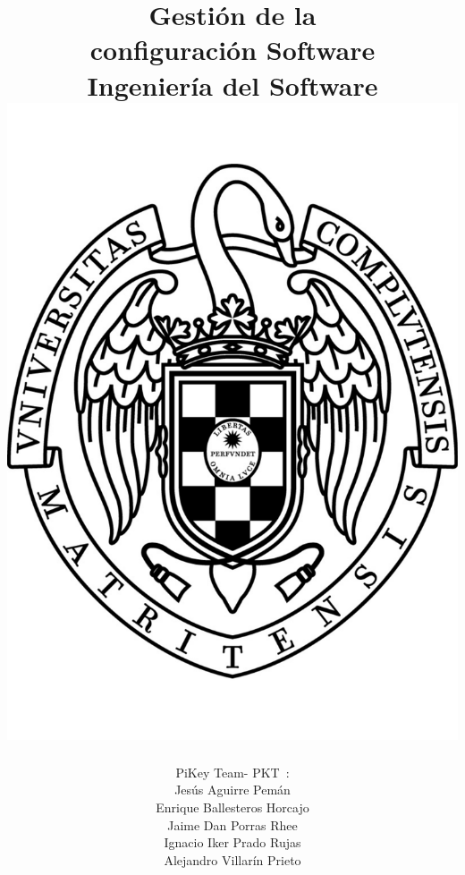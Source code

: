 \documentclass[spanish,a4paper,11pt, twoside]{report}	%
\newcommand*{\PKT}{\hbox{P}\kern-2.5pt\lower3.5pt\hbox{\small{K}}\kern-2.8pt\hbox{T}\kern-2pt}	%
\begin{document}
\title{\textbf{\huge{Gestión de la \\ 
	configuración Software}} \\ \vspace{0.3cm}
	\Large{Ingeniería del Software} \\
	\includegraphics[scale=0.3]{ucm.pdf}}
\author{{\Large{PiKey Team-}} \PKT \ : \vspace{0.2cm} \\
	Jesús Aguirre Pemán \\
	 Enrique Ballesteros Horcajo \\
	 Jaime Dan Porras Rhee \\
	 Ignacio Iker Prado Rujas \\
	 Alejandro Villarín Prieto }
\date{\Today}
\maketitle
\end{document}
